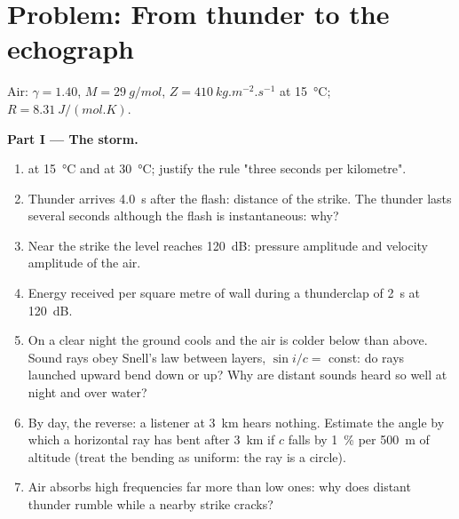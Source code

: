 \section{Problem: From thunder to the echograph}

\begin{problem}
\label{pb:b2:sound-waves:1}

Air: $\gamma = 1.40$, $M = \qty{29}{g/mol}$, $Z = \qty{410}{kg.m^{-2}.s^{-1}}$ at
\qty{15}{\degreeCelsius}; $R = \qty{8.31}{J/(mol.K)}$.

\medskip
\noindent\textbf{Part I --- The storm.}
\begin{enumerate}
  \item {} at \qty{15}{\degreeCelsius} and at \qty{30}{\degreeCelsius};
        justify the rule "three seconds per kilometre".
  \item Thunder arrives \qty{4.0}{s} after the flash: distance of the
        strike. The thunder lasts several seconds although the flash is
        instantaneous: why?
  \item Near the strike the level reaches \qty{120}{dB}: pressure amplitude
        and velocity amplitude of the air.
  \item Energy received per square metre of wall during a thunderclap
        of \qty{2}{s} at \qty{120}{dB}.
  \item On a clear night the ground cools and the air is colder below
        than above. Sound rays obey Snell's law between layers,
        $\sin i/c = $ const: do rays launched upward bend down or up?
        Why are distant sounds heard so well at night and over water?
  \item By day, the reverse: a listener at \qty{3}{km} hears nothing.
        Estimate the angle by which a horizontal ray has bent after
        \qty{3}{km} if $c$ falls by \qty{1}{\%} per \qty{500}{m} of altitude
        (treat the bending as uniform: the ray is a circle).

  \item Air absorbs high frequencies far more than low ones: why does
        distant thunder rumble while a nearby strike cracks?
\end{enumerate}


\end{problem}
